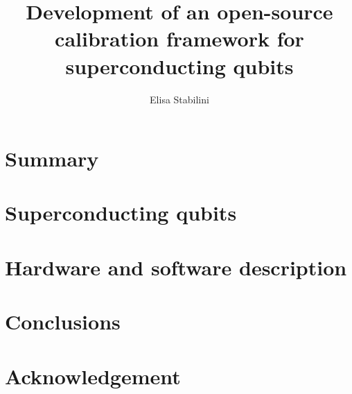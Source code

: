 \documentclass{book}
\title{Development of an open-source calibration framework for superconducting qubits}
\author{Elisa Stabilini}
\date{}
\begin{document}
\frontmatter


\clearpage

\clearpage
\tableofcontents
\clearpage


\chapter*{Summary}

\mainmatter
\chapter{Superconducting qubits}

\chapter{Hardware and software description}





\chapter{Conclusions}
%

\backmatter
\printbibliography

\chapter*{Acknowledgement}


\end{document}
